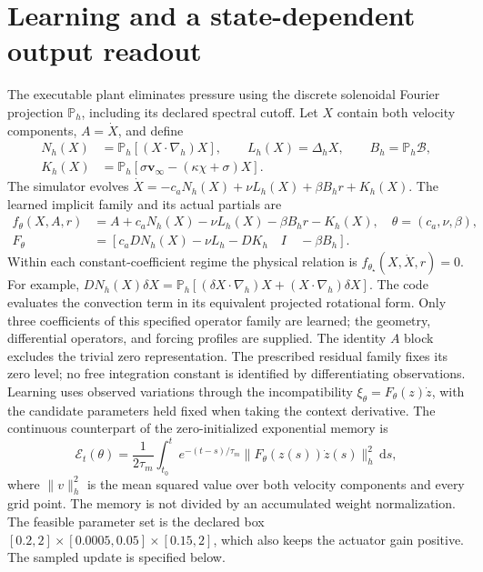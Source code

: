 \documentclass[10pt]{article}
\newcommand{\PP}{\mathbb P}
\newcommand{\dd}{\mathrm d}
\begin{document}
\section{Learning and a state-dependent output readout}
The executable plant eliminates pressure using the discrete solenoidal
Fourier projection $\PP_h$, including its declared spectral cutoff. Let
$X$ contain both velocity components, $A=\dot X$, and define
\begin{align}
 N_h(X)&=\PP_h[(X\cdot\nabla_h)X],\qquad
 L_h(X)=\Delta_hX,\qquad B_h=\PP_h\mathcal B,\\
 K_h(X)&=\PP_h[\sigma\bm v_\infty-(\kappa\chi+\sigma)X].
\end{align}
The simulator evolves $\dot X=-c_aN_h(X)+\nu L_h(X)+\beta B_hr+K_h(X)$.
The learned implicit family and its actual partials are
\begin{align}
 f_\theta(X,A,r)&=A+c_aN_h(X)-\nu L_h(X)-\beta B_hr-K_h(X),
 \quad \theta=(c_a,\nu,\beta),\label{eq:afc_discrete_residual}\\
 F_\theta&=\left[
 c_aDN_h(X)-\nu L_h-DK_h\quad I\quad -\beta B_h
 \right].\label{eq:afc_discrete_partials}
\end{align}
Within each constant-coefficient regime the physical relation is
$f_{\theta_\star}(X,\dot X,r)=0$.
For example,
$DN_h(X)\delta X=\PP_h[(\delta X\cdot\nabla_h)X+(X\cdot\nabla_h)\delta X]$.
The code evaluates the convection term in its equivalent projected rotational
form. Only three coefficients of this specified operator family are learned;
the geometry, differential operators, and forcing profiles are supplied.
The identity $A$ block excludes the trivial zero representation. The
prescribed residual family fixes its zero level; no free integration
constant is identified by differentiating observations. Learning uses
observed variations through the incompatibility
$\xi_\theta=F_\theta(z)\dot z$, with the candidate parameters held fixed
when taking the context derivative. The continuous counterpart of the
zero-initialized exponential memory is
\begin{equation}
 \mathcal E_t(\theta)=\frac{1}{2\tau_m}
  \int_{t_0}^{t}e^{-(t-s)/\tau_m}
  \|F_\theta(z(s))\dot z(s)\|_h^2\,\dd s,
 \label{eq:afc_energy}
\end{equation}
where $\|v\|_h^2$ is the mean squared value over both velocity components
and every grid point. The memory is not divided by an accumulated
weight normalization. The feasible
parameter set is the declared box
$[0.2,2]\times[0.0005,0.05]\times[0.15,2]$, which also keeps the actuator
gain positive. The sampled update is specified below.
\end{document}
